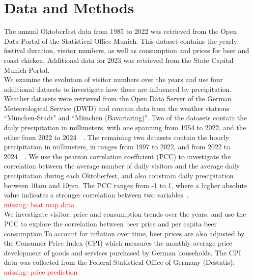 \documentclass{article}
\theoremstyle{plain}
\theoremstyle{definition}
\theoremstyle{remark}
\begin{document}
\section{Data and Methods}\label{sec:methods}
The annual Oktoberfest data from 1985 to 2022 was retrieved from the Open Data Portal of the Statistical Office Munich. This dataset contains the yearly festival duration, visitor numbers, as well as consumption and prices for beer and roast chicken. Additional data for 2023 was retrieved from the State Capital Munich Portal. \\
We examine the evolution of visitor numbers over the years and use four additional datasets to investigate how these are influenced by precipitation. Weather datasets were retrieved from the Open Data Server of the German Meteorological Service (DWD) and contain data from the weather stations ``München-Stadt" and ``München (Bavariaring)". Two of the datasets contain the daily precipitation in millimeters, with one spanning from 1954 to 2022, and the other from 2022 to 2024~\citep{3}~\citep{4}. The remaining two datasets contain the hourly precipitation in millimeters, in ranges from 1997 to 2022, and from 2022 to 2024~\citep{1}~\citep{2}. We use the pearson correlation coefficient (PCC) to investigate the correlation between the average number of daily visitors and the average daily precipitation during each Oktoberfest, and also constrain daily precipitation between 10am and 10pm. The PCC ranges from -1 to 1, where a higher absolute value indicates a stronger correlation between two variables~\cite{thonield}.\\
\textcolor{red}{missing: heat map data}\\
We investigate visitor, price and consumption trends over the years, and use the PCC to explore the correlation between beer price and per capita beer consumption.To account for inflation over time, beer prices are also adjusted by the Consumer Price Index (CPI) which measures the monthly average price development of goods and services purchased by German households. The CPI data was collected from the Federal Statistical Office of Germany (Destatis).\\
\textcolor{red}{missing: price prediction}\\

% 
\end{document}
